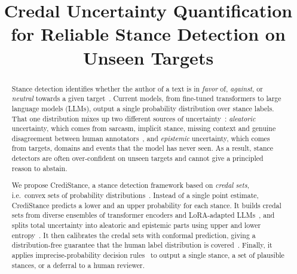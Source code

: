 \documentclass[11pt,a4paper]{article}
\title{Credal Uncertainty Quantification for Reliable Stance Detection on Unseen Targets}
\author{}
\date{}
\begin{document}
\maketitle
\vspace{-3em}

\begin{abstract}
\noindent
Stance detection identifies whether the author of a text is in \emph{favor} of,
\emph{against}, or \emph{neutral} towards a given target~\cite{mohammad2016,kucuk2020}.
Current models, from fine-tuned transformers to large language models (LLMs), output a
single probability distribution over stance labels. That one distribution mixes up two
different sources of uncertainty~\cite{hullermeier2021}: \emph{aleatoric} uncertainty,
which comes from sarcasm, implicit stance, missing context and genuine disagreement between
human annotators~\cite{allaway2020,plank2022}, and \emph{epistemic} uncertainty, which comes
from targets, domains and events that the model has never seen. As a result, stance
detectors are often over-confident on unseen targets and cannot give a principled reason
to abstain.

We propose CrediStance, a stance detection framework based on \emph{credal sets},
i.e.\ convex sets of probability distributions~\cite{walley1991}. Instead of a single
point estimate, CrediStance predicts a lower and an upper probability for each stance. It
builds credal sets from diverse ensembles of transformer encoders and LoRA-adapted
LLMs~\cite{wang2025wrapper,wang2024crede,manchingal2026}, and splits total uncertainty into
aleatoric and epistemic parts using upper and lower entropy~\cite{abellan2006}. It then
calibrates the credal sets with conformal prediction, giving a distribution-free guarantee
that the human label distribution is covered~\cite{javanmardi2024}. Finally, it applies
imprecise-probability decision rules~\cite{troffaes2007} to output a single stance, a set
of plausible stances, or a deferral to a human reviewer.


\end{abstract}
\end{document}
